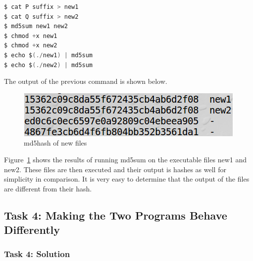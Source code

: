 \documentclass[12pt]{article}
\begin{document}
\begin{lstlisting}[backgroundcolor = \color{lightgray},
language = C,
xleftmargin = 2cm,
framexleftmargin = 1em]
$ cat P suffix > new1
$ cat Q suffix > new2
$ md5sum new1 new2
$ chmod +x new1
$ chmod +x new2
$ echo $(./new1) | md5sum
$ echo $(./new2) | md5sum
\end{lstlisting}

The output of the previous command is shown below.

\begin{figure}[H]
	\begin{center}
		\includegraphics[scale=0.65]{pics/t3p1.png}
	\end{center}{}
	\caption{md5hash of new files}
	\label{fig:t3p1}
\end{figure}

Figure~\ref{fig:t3p1} shows the results of running md5sum on the executable files new1 and new2. These files are then executed and their output is hashes as well for simplicity in comparison. It is very easy to determine that the output of the files are different from their hash.


\subsection{Task 4: Making the Two Programs Behave Differently}
\subsubsection{Task 4: Solution}
\end{document}
